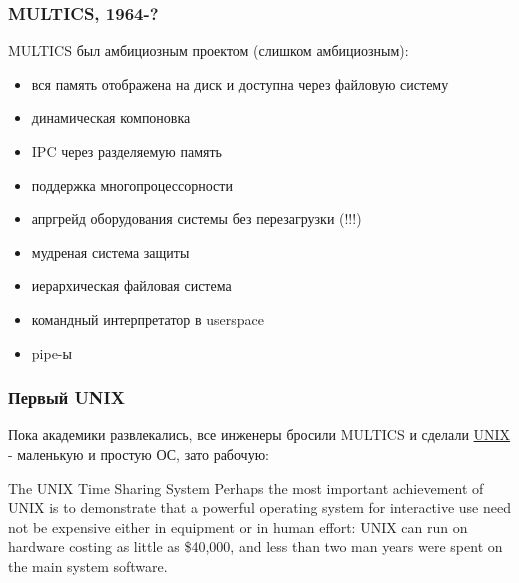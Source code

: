 \begin{frame}
\frametitle{MULTICS, 1964-?}

MULTICS был амбициозным проектом (слишком амбициозным):
\begin{itemize}
  \item вся память отображена на диск и доступна через файловую систему
  \item динамическая компоновка
  \item IPC через разделяемую память
  \item поддержка многопроцессорности
  \item апргрейд оборудования системы без перезагрузки (!!!)
  \item мудреная система защиты
  \item иерархическая файловая система
  \item командный интерпретатор в userspace
  \item pipe-ы
\end{itemize}
\end{frame}

\begin{frame}
\frametitle{Первый UNIX}

Пока академики развлекались, все инженеры бросили MULTICS и сделали
\href{http://www.cs.berkeley.edu/~brewer/cs262/unix.pdf}{UNIX} - маленькую и
простую ОС, зато рабочую:

\begin{block}{The UNIX Time Sharing System}
Perhaps the most important achievement of UNIX is to demonstrate that a
powerful operating system for interactive use need not be expensive either in
equipment or in human effort: UNIX can run on hardware costing as little as
\$40,000, and less than two man years were spent on the main system software.
\end{block}
\end{frame}
